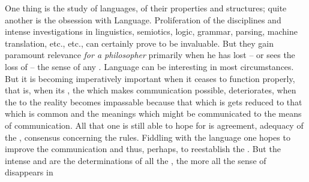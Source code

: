 \pa One thing is the study of languages, of their properties and structures;
quite another is the obsession with Language. Proliferation of the disciplines and intense
investigations in linguistics, semiotics, logic, grammar, parsing, machine
translation, etc., etc., can certainly prove to be invaluable. But they gain
paramount relevance {\em for a philosopher} primarily when he has lost -- or
sees the loss of -- the sense of any . Language can be interesting
in most circumstances. But it is becoming imperatively important when it ceases
to function properly, that is, when its , the 
which makes communication possible, deteriorates, when the  to the
 reality becomes impassable because that which is  gets
reduced to that which is common and the  meanings which might be
communicated to the  means of communication.  All that one is still
able to hope for is  agreement, adequacy of the , consensus
concerning the rules.  Fiddling with the language one hopes to improve the
 communication and thus, perhaps, to reestablish the .
But the  intense and  are the determinations of all the
 , the more all the sense of  disappears in
